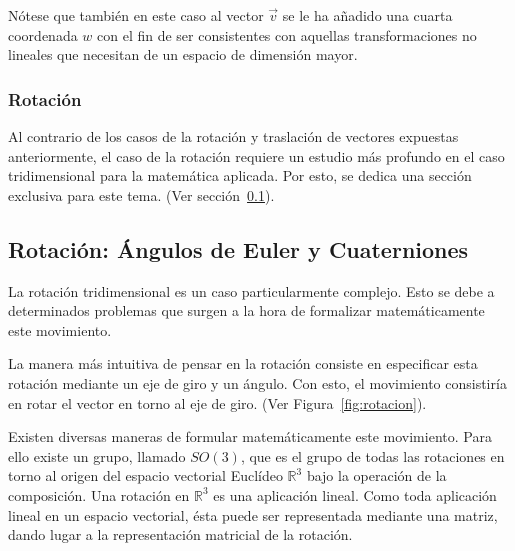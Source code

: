 Nótese que también en este caso al vector $\overrightarrow{v}$ se le ha añadido
una cuarta coordenada $w$ con el fin de ser consistentes con aquellas
transformaciones no lineales que necesitan de un espacio de dimensión mayor. 

\subsubsection{Rotación}
\label{makereference5.4.1.3}

Al contrario de los casos de la rotación y traslación de vectores expuestas
anteriormente, el caso de la rotación requiere un estudio más profundo en el
caso tridimensional para la matemática aplicada. Por esto, se dedica una sección
exclusiva para este tema. (Ver sección~\ref{makereference5.4.2}).

\subsection{Rotación: Ángulos de Euler y Cuaterniones}
\label{makereference5.4.2}

La rotación tridimensional es un caso particularmente complejo. Esto se debe a
determinados problemas que surgen a la hora de formalizar matemáticamente este
movimiento. 

La manera más intuitiva de pensar en la rotación consiste en especificar esta
rotación mediante un eje de giro y un ángulo. Con esto, el movimiento
consistiría en rotar el vector en torno al eje de giro. (Ver
Figura~\ref{fig:rotacion}). 

Existen diversas maneras de formular matemáticamente este movimiento. Para ello
existe un grupo, llamado $SO(3)$, que es el grupo de todas las rotaciones en
torno al origen del espacio vectorial Euclídeo $\mathbb{R}^3$ bajo la operación
de la composición. Una rotación en $\mathbb{R}^3$ es una aplicación lineal. Como
toda aplicación lineal en un espacio vectorial, ésta puede ser representada
mediante una matriz, dando lugar a la representación matricial de la rotación.

